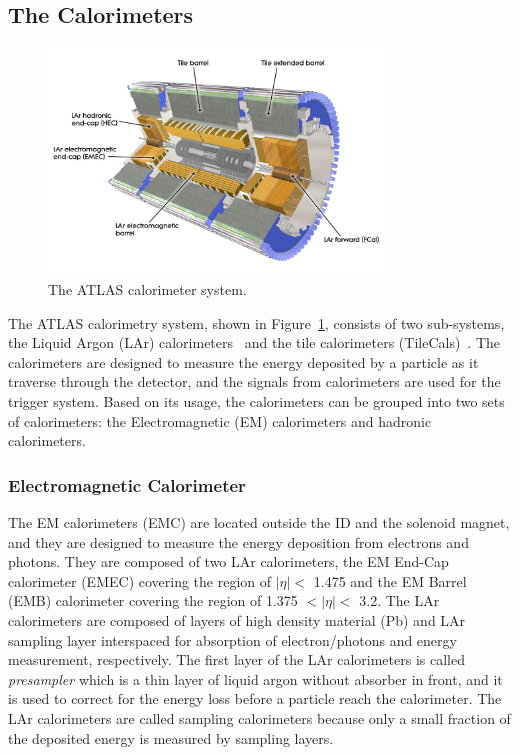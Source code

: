 \subsection{The Calorimeters}
\label{sec:atlas:calorimeter}

\begin{figure}[!htb]
    \includegraphics[width=0.8\textwidth]{figures/calorimeter.jpg}
    \centering
    \caption{The ATLAS calorimeter system.}
    \label{fig:calorimeter}
\end{figure}


The ATLAS calorimetry system, shown in Figure~\ref{fig:calorimeter}, consists of two sub-systems, the Liquid Argon (LAr) calorimeters~\cite{1742-6596-293-1-012044} and the tile calorimeters (TileCals)~\cite{HenriquesCorreia:2004868}. The calorimeters are designed to measure the energy deposited by a particle as it traverse through the detector, and the signals from calorimeters are used for the trigger system. Based on its usage, the calorimeters can be grouped into two sets of calorimeters: the Electromagnetic (EM) calorimeters and hadronic calorimeters.


\subsubsection{Electromagnetic Calorimeter}
\label{sec:atlas:EMcal}
The EM calorimeters (EMC) are located outside the ID and the solenoid magnet, and they are designed to measure the energy deposition from electrons and photons. They are composed of two LAr calorimeters, the EM End-Cap calorimeter (EMEC) covering the region of $|\eta|<$ 1.475 and the EM Barrel (EMB) calorimeter covering the region of 1.375 $<|\eta|<$ 3.2. The LAr calorimeters are composed of layers of high density material (Pb) and LAr sampling layer interspaced for absorption of electron/photons and energy measurement, respectively. The first layer of the LAr calorimeters is called \textit{presampler} which is a thin layer of liquid argon without absorber in front, and it is used to correct for the energy loss before a particle reach the calorimeter. The LAr calorimeters are called sampling calorimeters because only a small fraction of the deposited energy is measured by sampling layers.

